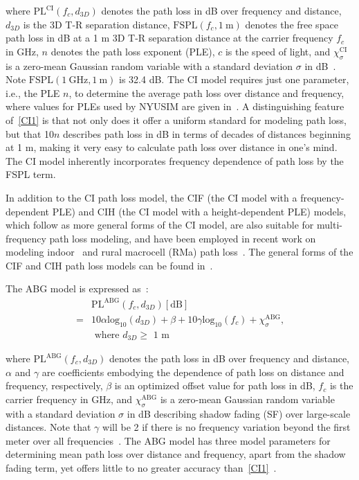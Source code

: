 \documentclass[journal]{IEEEtran}
\def\PL{\mathrm{PL}}
\def\dB{\mathrm{dB}}
\def\GHz{\mathrm{GHz}}
\def\log{\mathrm{log}}
\def\PL{\mathrm{PL}}
\def\dB{\mathrm{dB}}
\def\FSPL{\mathrm{FSPL}}
\def\log{\mathrm{log}}
\def\ABG{\mathrm{ABG}}
\def\CI{\mathrm{CI}}
\def\m{\mathrm{m}}
\begin{document}
\noindent where $\PL^{\CI}(f_c,d_{3D})$ denotes the path loss in dB over frequency and distance, $d_{3D}$ is the 3D T-R separation distance, $\FSPL(f_c, 1~\m)$ denotes the free space path loss in dB at a 1 m 3D T-R separation distance at the carrier frequency $f_c$ in GHz, $n$ denotes the path loss exponent (PLE), $c$ is the speed of light, and $\chi_{\sigma}^{\CI}$ is a zero-mean Gaussian random variable with a standard deviation $\sigma$ in dB~\cite{Sun16:TVT,Andersen95}. Note $\FSPL(1~\GHz, 1~\m)$ is 32.4 dB. The CI model requires just one parameter, i.e., the PLE $n$, to determine the average path loss over distance and frequency, where values for PLEs used by NYUSIM are given in~\cite{Sun17_NYUSIM,Sun16:TVT}. A distinguishing feature of~\eqref{CI1} is that not only does it offer a uniform standard for modeling path loss, but that 10$n$ describes path loss in dB in terms of decades of distances beginning at 1 m, making it very easy to calculate path loss over distance in one's mind. The CI model inherently incorporates frequency dependence of path loss by the FSPL term. 

In addition to the CI path loss model, the CIF (the CI model with a frequency-dependent PLE) and CIH (the CI model with a height-dependent PLE) models, which follow as more general forms of the CI model, are also suitable for multi-frequency path loss modeling, and have been employed in recent work on modeling indoor~\cite{Mac15_Indoor} and rural macrocell (RMa) path loss~\cite{Mac17_RMa}. The general forms of the CIF and CIH path loss models can be found in~\cite{Sun16:TVT,Xing16,Mac15_Indoor,Mac17_RMa}.

The ABG model is expressed as~\cite{Sun16:TVT}:
\begin{equation}\label{ABG1}
\begin{split}
&\PL^{\ABG}(f_c,d_{3D})[\dB]\\
=&10\alpha \log_{10}\left(d_{3D}\right)+\beta+10\gamma \log_{10}\left(f_c\right)+\chi_{\sigma}^{\ABG} \text{,}
\\ &\text{ where } d_{3D}\geq\textrm{ 1 m}
\end{split}
\end{equation}

\noindent where $\PL^{\ABG}(f_c,d_{3D})$ denotes the path loss in dB over frequency and distance, $\alpha$ and $\gamma$ are coefficients embodying the dependence of path loss on distance and frequency, respectively, $\beta$ is an optimized offset value for path loss in dB, $f_c$ is the carrier frequency in GHz, and $\chi_{\sigma}^{\ABG}$ is a zero-mean Gaussian random variable with a standard deviation $\sigma$ in dB describing shadow fading (SF) over large-scale distances. Note that $\gamma$ will be 2 if there is no frequency variation beyond the first meter over all frequencies~\cite{Sun16:TVT}. The ABG model has three model parameters for determining mean path loss over distance and frequency, apart from the shadow fading term, yet offers little to no greater accuracy than~\eqref{CI1}~\cite{Sun16:TVT}.
\end{document}
